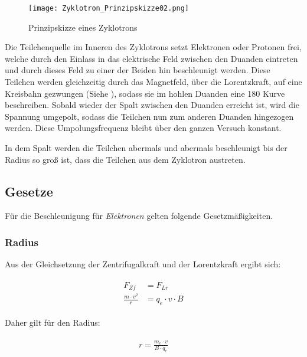\begin{wrapfigure}{o}{0.4\textwidth} \label{Zyklo}

	\vspace{-10pt}
	\texttt{[image: Zyklotron\_Prinzipskizze02.png]}
	\vspace{-13pt}
	\caption{Prinzipskizze eines Zyklotrons}
	\vspace{-5pt}	
	
\end{wrapfigure}

Die Teilchenquelle im Inneren des Zyklotrons setzt Elektronen oder Protonen frei, welche durch den Einlass in das elektrische Feld zwischen den Duanden eintreten und durch dieses Feld zu einer der Beiden hin beschleunigt werden. Diese Teilchen werden gleichzeitig durch das Magnetfeld, über die Lorentzkraft, auf eine Kreisbahn gezwungen (Siehe ), sodass sie im hohlen Duanden eine 180\degree{} Kurve beschreiben. Sobald wieder der Spalt zwischen den Duanden erreicht ist, wird die Spannung umgepolt, sodass die Teilchen nun zum anderen Duanden hingezogen werden. Diese Umpolungsfrequenz bleibt über den ganzen Versuch konstant.

In dem Spalt werden die Teilchen abermals und abermals beschleunigt bis der Radius so groß ist, dass die Teilchen aus dem Zyklotron austreten.


\subsection{Gesetze}

Für die Beschleunigung für \emph{Elektronen} gelten folgende Gesetzmäßigkeiten.

\subsubsection{Radius}

Aus der Gleichsetzung der Zentrifugalkraft und der Lorentzkraft ergibt sich: 

\begin{align}
\begin{split}
	F_{Zf} &= F_{Lr} \\
	\frac{m \cdot v^2}{r} &= q_e \cdot v \cdot B
\end{split}
\end{align}

\noindent Daher gilt für den Radius:

\begin{align} \label{eq:ZyklotronRadius}
\begin{split}
	r = \frac{m_e \cdot v}{B \cdot q_e}
\end{split}
\end{align}


